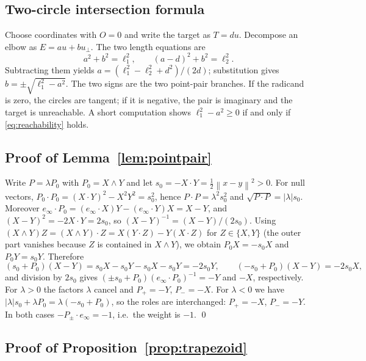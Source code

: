 \documentclass[11pt,a4paper]{article}
\theoremstyle{plain}
\theoremstyle{definition}
\theoremstyle{remark}
\newcommand{\einf}{e_{\infty}}
\newcommand{\norm}[1]{\left\lVert#1\right\rVert}
\newcommand{\abs}[1]{\left\lvert#1\right\rvert}
\begin{document}
\subsection{Two-circle intersection formula}

Choose coordinates with $O=0$ and write the target as $T=du$. Decompose an elbow
as $E=au+bu_{\perp}$. The two length equations are
\begin{equation}
  a^2+b^2=\ell_1^2,
  \qquad
  (a-d)^2+b^2=\ell_2^2 .
\end{equation}
Subtracting them yields $a=(\ell_1^2-\ell_2^2+d^2)/(2d)$; substitution gives
$b=\pm\sqrt{\ell_1^2-a^2}$. The two signs are the two point-pair branches. If the
radicand is zero, the circles are tangent; if it is negative, the pair is
imaginary and the target is unreachable. A short computation shows
$\ell_1^2-a^2\ge0$ if and only if \cref{eq:reachability} holds.

\subsection{Proof of Lemma~\ref{lem:pointpair}}\label{app:pointpair}

Write $P=\lambda P_0$ with $P_0=X\wedge Y$ and let $s_0=-X\cdot Y=\frac12\norm{x-y}^2>0$.
For null vectors, $P_0\cdot P_0=(X\cdot Y)^2-X^2Y^2=s_0^2$, hence
$P\cdot P=\lambda^2s_0^2$ and $\sqrt{P\cdot P}=\abs{\lambda}s_0$. Moreover
$\einf\cdot P_0=(\einf\cdot X)Y-(\einf\cdot Y)X=X-Y$, and
$(X-Y)^2=-2X\cdot Y=2s_0$, so $(X-Y)^{-1}=(X-Y)/(2s_0)$. Using
$(X\wedge Y)Z=(X\wedge Y)\cdot Z=X(Y\cdot Z)-Y(X\cdot Z)$ for $Z\in\{X,Y\}$
(the outer part vanishes because $Z$ is contained in $X\wedge Y$), we obtain
$P_0X=-s_0X$ and $P_0Y=s_0Y$. Therefore
\begin{equation}
  (s_0+P_0)(X-Y)=s_0X-s_0Y-s_0X-s_0Y=-2s_0Y,
  \qquad
  (-s_0+P_0)(X-Y)=-2s_0X,
\end{equation}
and division by $2s_0$ gives $(\pm s_0+P_0)(\einf\cdot P_0)^{-1}=-Y$ and $-X$,
respectively. For $\lambda>0$ the factors $\lambda$ cancel and
$P_+=-Y$, $P_-=-X$. For $\lambda<0$ we have $\abs{\lambda}s_0+\lambda P_0=
\lambda(-s_0+P_0)$, so the roles are interchanged: $P_+=-X$, $P_-=-Y$. In both
cases $-P_\pm\cdot\einf=-1$, i.e.\ the weight is $-1$. \qed

\subsection{Proof of Proposition~\ref{prop:trapezoid}}\label{app:trapezoid}
\end{document}
